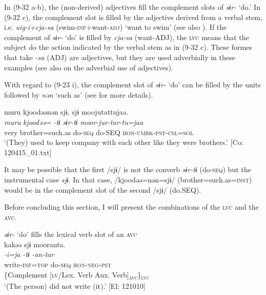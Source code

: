 In (9-32 a-b), the (non-derived) adjectives fill the complement slots of \textit{sɨr-} ‘do.’ In (9-32 c), the complement slot is filled by the adjective derived from a verbal stem, i.e. \textit{uig-i+cja-sa} (swim-\textsc{inf}+want-\textsc{adj}) ‘want to swim’ (see also ). If the complement of \textit{sɨr-} ‘do’ is filled by \textit{cja-sa} (want-ADJ), the \textsc{lvc} means that the subject  do the action indicated by the verbal stem as in (9-32 c). These formes that take \textit{{}-sa} (ADJ) are adjectives, but they are used adverbially in these examples (see also  on the adverbial use of adjectives).

With regard to (9-23 i), the complement slot of \textit{sɨr-} ‘do’ can be filled by the units followed by \textit{nən} ‘such as’ (see  for more details).

\ea   \label{ex:9.33}
\glll  muru  kjoodəənən  sjɨ,  sjɨ  moojutattujaa.\\
    \textit{muru}  \textit{kjoodəə=}  \textit{-tɨ}  \textit{sɨr-tɨ}  \textit{moor-jur-tar-tu=jaa}\\
    very  brother=such.as  do-\textsc{seq}  do-SEQ  \textsc{hon}-\textsc{umrk}-\textsc{pst}-\textsc{csl}=\textsc{sol}\\
    \glt     ‘(They) used to keep company with each other like they were brothers.’ [Co: 120415\_01.txt]
\z

It may be possible that the first /sjɨ/ is not the converb \textit{sɨr-tɨ} (do-\textsc{seq}) but the instrumental case \textit{sjɨ}. In that case, /kjoodəə=nən=sjɨ/ (brother=such.as=\textsc{inst}) would be in the complement slot of the second /sjɨ/ (do.SEQ).

Before concluding this section, I will present the combinations of the \textsc{lvc} and the \textsc{avc}.

\ea   \label{ex:9.34}
\ea \textit{sɨr-} ‘do’ fills the lexical verb slot of an \textsc{avc} \label{ex:9.34a}\\
 \gllll  kakəə  sjɨ  mooranta.\\
    \textit{-i=ja}  \textit{-tɨ}  \textit{-an-tar}\\
    write-\textsc{inf}=\textsc{top}  do-\textsc{seq}  \textsc{hon}-\textsc{neg}-\textsc{pst}\\
    {\{Complement}  {[\textsc{lv}/Lex. Verb}  {Aux. Verb]\textsubscript{\textsc{avc}}\}\textsubscript{\textsc{lvc}}}\\
    \glt     ‘(The person) did not write (it).’ [El: 121010]

